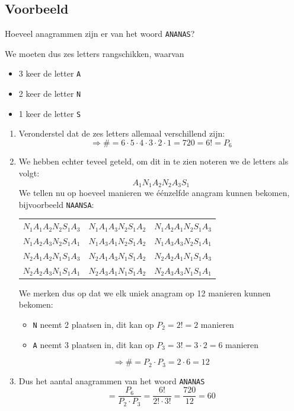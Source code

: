 \documentclass[12pt,twoside]{article}
\begin{document}
\begin{theorie}

\subsection{Voorbeeld}

Hoeveel anagrammen zijn er van het woord \verb#ANANAS#?

We moeten dus zes letters rangschikken, waarvan
\begin{itemize}
  \item 3 keer de letter \verb#A#
  \item 2 keer de letter \verb#N#
  \item 1 keer de letter \verb#S#
\end{itemize}

\begin{enumerate}
  \item Veronderstel dat de zes letters allemaal verschillend zijn:\\
  $$\Rightarrow \#=6\cdot5\cdot4\cdot3\cdot2\cdot1=720=6!=P_6$$
  \item We hebben echter teveel geteld, om dit in te zien noteren we de letters als volgt:
  $$A_1N_1A_2N_2A_3S_1$$
  We tellen nu op hoeveel manieren we éénzelfde anagram kunnen bekomen, bijvoorbeeld \verb#NAANSA#:
  \begin{center}
  \begin{tabular}{ccc}
    $N_1A_1A_2N_2S_1A_3$ & $N_1A_1A_3N_2S_1A_2$ & $N_1A_2A_1N_2S_1A_3$\\
    $N_1A_2A_3N_2S_1A_1$ & $N_1A_3A_1N_2S_1A_2$ & $N_1A_3A_3N_2S_1A_1$\\
    $N_2A_1A_2N_1S_1A_3$ & $N_2A_1A_3N_1S_1A_2$ & $N_2A_2A_1N_1S_1A_3$\\
    $N_2A_2A_3N_1S_1A_1$ & $N_2A_3A_1N_1S_1A_2$ & $N_2A_3A_3N_1S_1A_1$\\
  \end{tabular}
  \end{center}
  We merken dus op dat we elk uniek anagram op 12 manieren kunnen bekomen:
  \begin{itemize}
    \item \verb#N# neemt 2 plaatsen in, dit kan op $P_2=2!=2$ manieren
    \item \verb#A# neemt 3 plaatsen in, dit kan op $P_3=3!=3\cdot2=6$ manieren
  \end{itemize}
  $$\Rightarrow \#=P_2\cdot P_3=2\cdot6=12$$
  \item Dus het aantal anagrammen van het woord \verb#ANANAS#
  $$=\dfrac{P_6}{P_2\cdot P_3}=\dfrac{6!}{2!\cdot 3!}=\dfrac{720}{12}=60$$
\end{enumerate}


\end{theorie}
\end{document}
